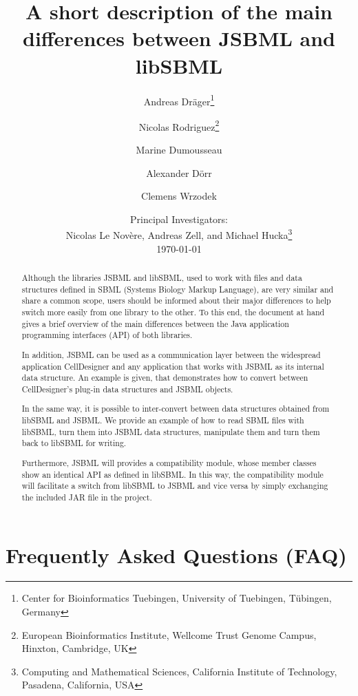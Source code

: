 \documentclass[
  BCOR12mm,
  letterpaper,
  11pt,
  headsepline,
  pointlessnumbers,
  tablecaptionabove,
  onelinecaption,
  headinclude,
  appendixprefix,
  idxtotoc,
  bibtotoc,
  twoside,
  titlepage
]{scrartcl}
\title{A short description of the main differences between JSBML and libSBML}
\author{Andreas Dr\"ager\thanks{Center for Bioinformatics Tuebingen, University
of Tuebingen, T\"ubingen, Germany}\and%
Nicolas Rodriguez\thanks{European Bioinformatics Institute, Wellcome Trust
Genome Campus, Hinxton, Cambridge, UK}\and%
Marine Dumousseau\footnotemark[2]\and%
Alexander D\"orr\footnotemark[1]\and%
Clemens Wrzodek\footnotemark[1]}
\date{Principal Investigators:\\
Nicolas Le Nov{\`e}re\footnotemark[2], Andreas Zell\footnotemark[1], and Michael
Hucka\thanks{Computing and Mathematical Sciences, California Institute of
Technology, Pasadena, California, USA}\\[4ex]
\today}
\begin{document}
\maketitle

\begin{abstract}
Although the libraries JSBML and libSBML, used to work with files and data
structures defined in SBML (Systems Biology Markup Language), are
very similar and share a common scope, users should be informed about their
major differences to help switch more easily from one library to the other. To
this end, the document at hand gives a brief overview of the main differences
between the Java\texttrademark{} application programming interfaces (API) of
both libraries.

In addition, JSBML can be used as a communication layer between the widespread
application CellDesigner and any application that works with JSBML as its
internal data structure. An example is given, that demonstrates how to
convert between CellDesigner's plug-in data structures and JSBML objects.

In the same way, it is possible to inter-convert between data structures
obtained from libSBML and JSBML. We provide an example of how to read SBML files
with libSBML, turn them into JSBML data structures, manipulate them and turn
them back to libSBML for writing.

Furthermore, JSBML will provides a compatibility module, whose member classes
show an identical API as defined in libSBML. In this way, the
compatibility module will facilitate a switch from libSBML to JSBML and vice
versa by simply exchanging the included JAR file in the project.


\end{abstract}

\tableofcontents


\appendix

\section{Frequently Asked Questions (FAQ)}





\printindex
\end{document}
